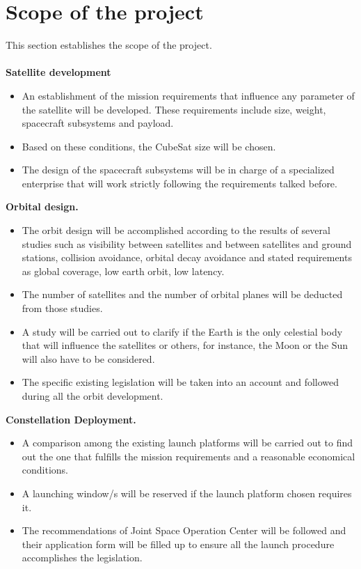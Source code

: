 \section{Scope of the project}
This section establishes the scope of the project. \\\\
{\bfseries Satellite development} 
\begin{itemize}
	\item An establishment of the mission requirements that influence any parameter of the satellite will be developed. These requirements include size, weight, spacecraft subsystems and payload. 
	\item Based on these conditions, the CubeSat size will be chosen.  
	\item The design of the spacecraft subsystems will be in charge of a specialized enterprise that will work strictly following the requirements talked before. 
\end{itemize}

{\bfseries Orbital design.}

\begin{itemize}
	\item The orbit design will be accomplished according to the results of several studies such as visibility between satellites and between satellites and ground stations, collision avoidance, orbital decay avoidance and stated requirements as global coverage, low earth orbit, low latency. 
	\item The number of satellites and the number of orbital planes will be deducted from those studies. 
	\item A study will be carried out to clarify if the Earth is the only celestial body that will influence the satellites or others, for instance, the Moon or the Sun will also have to be considered. 
	\item The specific existing legislation will be taken into an account and followed during all the orbit development.
\end{itemize}

{\bfseries Constellation Deployment.} 

\begin{itemize}
	\item A comparison among the existing launch platforms will be carried out to find out the one that fulfills the mission requirements and a reasonable economical conditions.
	\item A launching window/s will be reserved if the launch platform chosen requires it. 
	\item The recommendations of Joint Space Operation Center will be followed and their application form will be filled up to ensure all the launch procedure accomplishes the legislation. 
\end{itemize}

